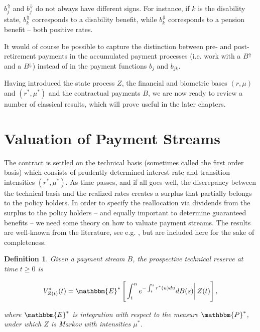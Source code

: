 \documentclass{book}
\newcommand{\1}[1]{\mathbbm{1}_{\left\lbrace #1 \right\rbrace}}
\newcommand{\econdStar}[2][def]{\mathbbm{E}^* \left[ \left. #1 \right| #2 \right]}
\theoremstyle{break}
\newtheorem{definition}{Definition}%
\theoremstyle{remark}
\newenvironment{remark}
  {\pushQED{\qed}\renewcommand{\qedsymbol}{\scalebox{1.4}{$\circ$}}\remarkx}
  {\popQED\endremarkx}
\numberwithin{equation}{section}
\begin{document}
\begin{remark}
	$b_j^{\Uparrow}$ and $b_j^{\Downarrow}$ do not always have different signs. For instance, if $k$ is the disability state, $b_k^{\Uparrow}$ corresponds to a disability benefit, while $b_k^{\Downarrow}$ corresponds to a pension benefit -- both positive rates.
\end{remark}

\begin{remark}
	It would of course be possible to capture the distinction between pre- and post-retirement payments in the accumulated payment processes (i.e. work with a $B^{\Uparrow}$ and a $B^{\Downarrow}$) instead of in the payment functions $b_j$ and $b_{jk}$.
\end{remark}

Having introduced the state process $Z$, the financial and biometric bases $(r,\mu)$ and $(r^*,\mu^*)$ and the contractual payments $B$, we are now ready to review a number of classical results, which will prove useful in the later chapters.

\section{Valuation of Payment Streams}

The contract is settled on the technical basis (sometimes called the first order basis) which consists of prudently determined interest rate and transition intensities $(r^*,\mu^*)$. As time passes, and if all goes well, the discrepancy between the technical basis and the realized rates creates a surplus that partially belongs to the policy holders. In order to specify the reallocation via dividends from the surplus to the policy holders -- and equally important to determine guaranteed benefits -- we need some theory on how to valuate payment streams. The results are well-known from the literature, see e.g. \cite{Norberg1991}, but are included here for the sake of completeness.

\begin{definition}
	Given a payment stream $B$, the prospective technical reserve at time $t \geq 0$ is
	
	\begin{align*}
		V_{Z(t)}^*(t) = \econdStar[\int_t^n e^{-\int_t^s r^*(u)du} dB(s)]{Z(t)},
	\end{align*}
	
	where $\mathbbm{E}^*$ is integration with respect to the measure $\mathbbm{P}^*$, under which $Z$ is Markov with intensities $\mu^*$.
\end{definition}
\end{document}
